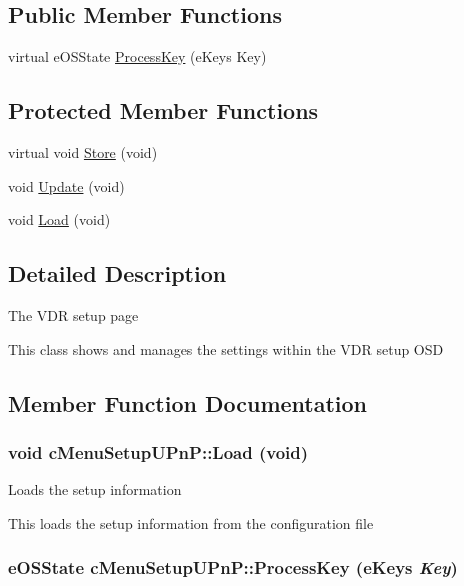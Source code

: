 \subsection*{Public Member Functions}
\begin{CompactItemize}
\item 
virtual eOSState \hyperlink{classcMenuSetupUPnP_5a6d78afea79d330e710d09b808d5240}{ProcessKey} (eKeys Key)
\end{CompactItemize}
\subsection*{Protected Member Functions}
\begin{CompactItemize}
\item 
virtual void \hyperlink{classcMenuSetupUPnP_e90738a7757dcc01e64e8ccad2f8a0e6}{Store} (void)
\item 
void \hyperlink{classcMenuSetupUPnP_ed45944671b8974f7639aefee11e8f50}{Update} (void)
\item 
void \hyperlink{classcMenuSetupUPnP_6f3e5ab68db53ce74ec81af07671d00e}{Load} (void)
\end{CompactItemize}


\subsection{Detailed Description}
The VDR setup page

This class shows and manages the settings within the VDR setup OSD 

\subsection{Member Function Documentation}
\hypertarget{classcMenuSetupUPnP_6f3e5ab68db53ce74ec81af07671d00e}{
\subsubsection[{Load}]{\setlength{\rightskip}{0pt plus 5cm}void cMenuSetupUPnP::Load (void)}}
\label{classcMenuSetupUPnP_6f3e5ab68db53ce74ec81af07671d00e}


Loads the setup information

This loads the setup information from the configuration file \hypertarget{classcMenuSetupUPnP_5a6d78afea79d330e710d09b808d5240}{
\subsubsection[{ProcessKey}]{\setlength{\rightskip}{0pt plus 5cm}eOSState cMenuSetupUPnP::ProcessKey (eKeys {\em Key})}}
\label{classcMenuSetupUPnP_5a6d78afea79d330e710d09b808d5240}



